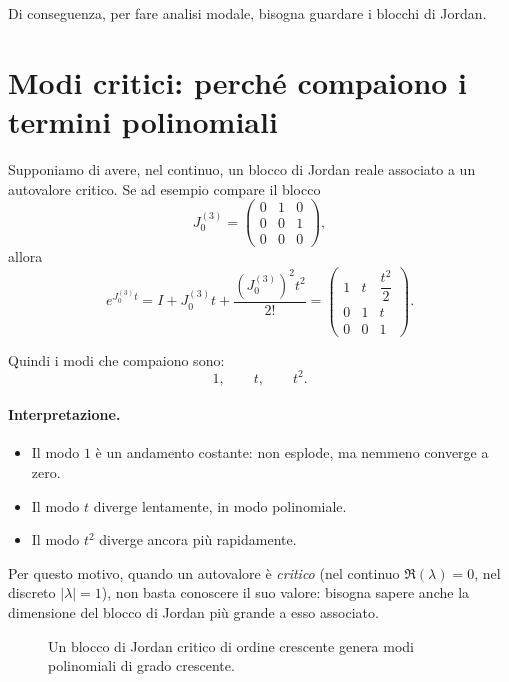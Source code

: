 Di conseguenza, per fare analisi modale, bisogna guardare i blocchi di Jordan.

\section{Modi critici: perché compaiono i termini polinomiali}

Supponiamo di avere, nel continuo, un blocco di Jordan reale associato a un autovalore critico.  
Se ad esempio compare il blocco
\[
J_0^{(3)}=
\begin{pmatrix}
0 & 1 & 0\\
0 & 0 & 1\\
0 & 0 & 0
\end{pmatrix},
\]
allora
\[
e^{J_0^{(3)}t}
=
I + J_0^{(3)}t + \frac{(J_0^{(3)})^2 t^2}{2!}
=
\begin{pmatrix}
1 & t & \dfrac{t^2}{2}\\
0 & 1 & t\\
0 & 0 & 1
\end{pmatrix}.
\]

Quindi i modi che compaiono sono:
\[
1,\qquad t,\qquad t^2.
\]

\paragraph{Interpretazione.}
\begin{itemize}
    \item Il modo $1$ è un andamento costante: non esplode, ma nemmeno converge a zero.
    \item Il modo $t$ diverge lentamente, in modo polinomiale.
    \item Il modo $t^2$ diverge ancora più rapidamente.
\end{itemize}

Per questo motivo, quando un autovalore è \emph{critico} (nel continuo $\Re(\lambda)=0$, nel discreto $|\lambda|=1$), non basta conoscere il suo valore: bisogna sapere anche la dimensione del blocco di Jordan più grande a esso associato.

\begin{figure}[H]
\centering
{}
\caption{Un blocco di Jordan critico di ordine crescente genera modi polinomiali di grado crescente.}
\end{figure}

